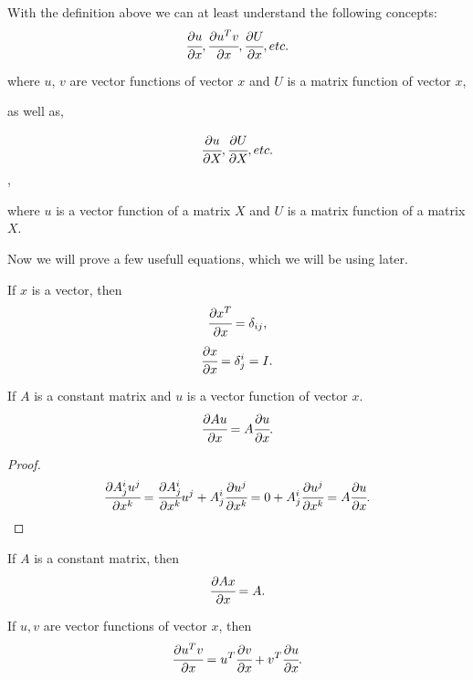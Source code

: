 \documentclass[main.tex]{subfiles}
\begin{document}
With the definition above we can at least understand the following concepts:
$$
\cfrac{\partial u}{\partial x}, \cfrac{\partial u^T v}{\partial x}, \cfrac{\partial U}{\partial x}, etc.
$$

where $u$, $v$ are vector functions of vector $x$ and $U$ is a matrix function of vector $x$, 

as well as,

$$
\cfrac{\partial u}{\partial X}, \cfrac{\partial U}{\partial X}, etc.
$$,

where $u$ is a vector function of a matrix $X$ and $U$ is a matrix function of a matrix $X$.


Now we will prove a few usefull equations, which we will be using later.

\begin{theorem}
If $x$ is a vector, then
\begin{equation}
\cfrac{\partial x^T}{\partial x} = \delta_{ij},
\end{equation}
\begin{equation}
\cfrac{\partial x}{\partial x} = \delta^i_j = I.
\end{equation}
\end{theorem}
\begin{theorem}
If $A$ is a constant matrix and $u$ is a vector function of vector $x$.
\begin{equation}
\cfrac{\partial Au}{\partial x} = A\cfrac{\partial u}{\partial x}.    
\end{equation}
\end{theorem}
\begin{proof}
\begin{equation}
\label{constant_out_fun}
\cfrac{\partial A^i_j u^j}{\partial x^k} = \cfrac{\partial A^i_j}{\partial x^k} u^j + A^i_j \cfrac{\partial u^j}{\partial x^k} = 0 + A^i_j \cfrac{\partial u^j}{\partial x^k} = A \cfrac{\partial u}{\partial x}.
\end{equation}
\end{proof}
\begin{corollary}
\label{constant_out}
If $A$ is a constant matrix, then
\begin{equation}
\cfrac{\partial Ax}{\partial x} = A.    
\end{equation}
\end{corollary}
\begin{theorem}
\label{deriviative_multiplication}
If $u, v$ are vector functions of vector $x$, then
\begin{equation}
\cfrac{\partial u^T v}{\partial x} = u^T \cfrac{\partial v}{\partial x} + v^T \cfrac{\partial u}{\partial x}.
\end{equation}
\end{theorem}
\end{document}
